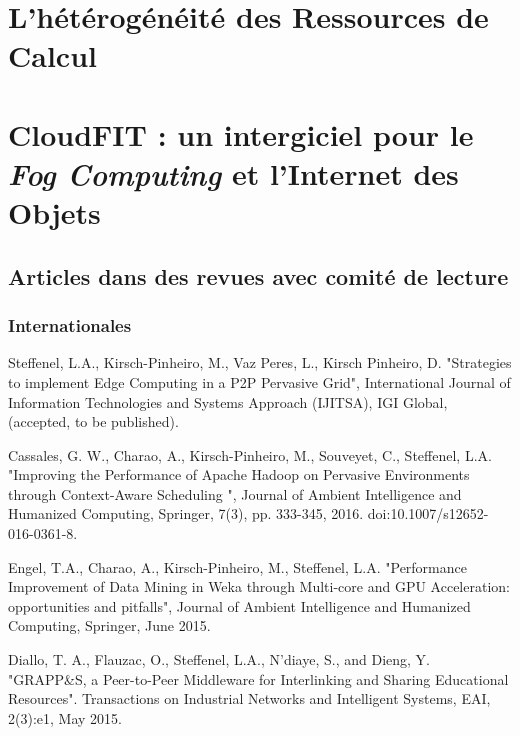 \documentclass[final,twoside]{hdr} %
\begin{document}


\chapter{L'hétérogénéité des Ressources de Calcul}



\chapter{CloudFIT : un intergiciel pour le \textit{Fog Computing} et l'Internet des Objets\label{chap:CloudFIT}}








\section*{Articles dans des revues avec comité de lecture}

\subsection*{Internationales}

Steffenel, L.A., Kirsch-Pinheiro, M., Vaz Peres, L., Kirsch Pinheiro, D. "Strategies to implement Edge Computing in a P2P Pervasive Grid", International Journal of Information Technologies and Systems Approach (IJITSA), IGI Global, (accepted, to be published). 

Cassales, G. W., Charao, A., Kirsch-Pinheiro, M., Souveyet, C., Steffenel, L.A. "Improving the Performance of Apache Hadoop on Pervasive Environments through Context-Aware Scheduling ", Journal of Ambient Intelligence and Humanized Computing, Springer, 7(3), pp. 333-345, 2016. doi:10.1007/s12652-016-0361-8. 

Engel, T.A., Charao, A., Kirsch-Pinheiro, M., Steffenel, L.A. "Performance Improvement of Data Mining in Weka through Multi-core and GPU Acceleration: opportunities and pitfalls", Journal of Ambient Intelligence and Humanized Computing, Springer, June 2015. 

Diallo, T. A., Flauzac, O., Steffenel, L.A., N’diaye, S., and Dieng, Y. "GRAPP\&S, a Peer-to-Peer Middleware for Interlinking and Sharing Educational Resources". Transactions on Industrial Networks and Intelligent Systems, EAI, 2(3):e1, May 2015. 
\end{document}
